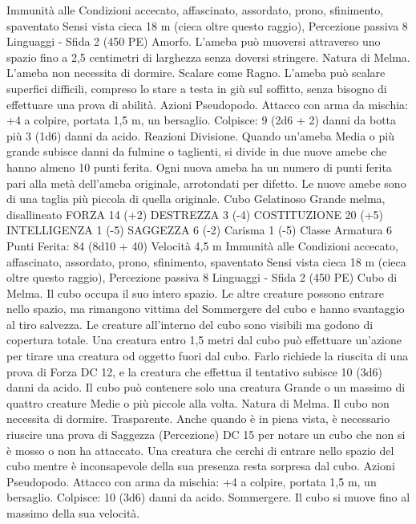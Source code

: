 \begin{multicols}{2}
Immunità alle Condizioni accecato, affascinato, assordato,
prono, sfinimento, spaventato
Sensi vista cieca 18 m (cieca oltre questo raggio), Percezione
passiva 8
Linguaggi -
Sfida 2 (450 PE)
Amorfo. L’ameba può muoversi attraverso uno spazio fino a 2,5
centimetri di larghezza senza doversi stringere.
Natura di Melma. L’ameba non necessita di dormire.
Scalare come Ragno. L’ameba può scalare superfici difficili,
compreso lo stare a testa in giù sul soffitto, senza bisogno di
effettuare una prova di abilità.
Azioni
Pseudopodo. Attacco con arma da mischia: +4 a colpire, portata
1,5 m, un bersaglio.
Colpisce: 9 (2d6 + 2) danni da botta più 3 (1d6) danni da acido.
Reazioni
Divisione. Quando un’ameba Media o più grande subisce danni da
fulmine o taglienti, si divide in due nuove amebe che hanno almeno
10 punti ferita. Ogni nuova ameba ha un numero di punti ferita pari
alla metà dell’ameba originale, arrotondati per difetto. Le nuove
amebe sono di una taglia più piccola di quella originale.
Cubo Gelatinoso
Grande melma, disallineato
FORZA 14 (+2)
DESTREZZA 3 (-4)
COSTITUZIONE 20 (+5)
INTELLIGENZA 1 (-5)
SAGGEZZA 6 (-2)
Carisma 1 (-5)
Classe Armatura 6
\hspace*{0pt}\hfill{Punti Ferita}: 84 (8d10 + 40)
Velocità 4,5 m
Immunità alle Condizioni accecato, affascinato, assordato,
prono, sfinimento, spaventato
Sensi vista cieca 18 m (cieca oltre questo raggio), Percezione
passiva 8
Linguaggi -
Sfida 2 (450 PE)
Cubo di Melma. Il cubo occupa il suo intero spazio. Le altre
creature possono entrare nello spazio, ma rimangono vittima del
Sommergere del cubo e hanno svantaggio al tiro salvezza.
Le creature all’interno del cubo sono visibili ma godono di
copertura totale.
Una creatura entro 1,5 metri dal cubo può effettuare un’azione
per tirare una creatura od oggetto fuori dal cubo. Farlo richiede la
riuscita di una prova di Forza DC 12, e la creatura che effettua il
tentativo subisce 10 (3d6) danni da acido.
Il cubo può contenere solo una creatura Grande o un massimo di
quattro creature Medie o più piccole alla volta.
Natura di Melma. Il cubo non necessita di dormire.
Trasparente. Anche quando è in piena vista, è necessario riuscire
una prova di Saggezza (Percezione) DC 15 per notare un cubo
che non si è mosso o non ha attaccato. Una creatura che cerchi di
entrare nello spazio del cubo mentre è inconsapevole della sua
presenza resta sorpresa dal cubo.
Azioni
Pseudopodo. Attacco con arma da mischia: +4 a colpire, portata
1,5 m, un bersaglio.
Colpisce: 10 (3d6) danni da acido.
Sommergere. Il cubo si muove fino al massimo della sua velocità.

\end{multicols}
